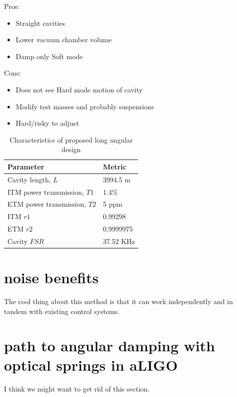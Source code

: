 Pros:

\begin{itemize}
	\item Straight cavities
	\item Lower vacuum chamber volume
	\item Damp only Soft mode
\end{itemize}

Cons:
\begin{itemize}
	\item Does not see Hard mode motion of cavity
	\item Modify test masses and probably suspensions
	\item Hard/risky to adjust
\end{itemize}


\begin{table}[htp]
\centering
\begin{tabular}{ l | l | }
\bf{Parameter}& \bf{Metric}  \\ \hline
Cavity length, $L$ & 3994.5 m \\ \hline
ITM power transmission, $T1$ & 1.4\% \\ \hline %
ETM power transmission, $T2$ & 5 ppm \\ \hline
ITM $r1$ & 0.99298 \\ \hline
ETM $r2$ &0.9999975 \\ \hline
Cavity $FSR$ & 37.52 KHz \\ \hline
\end{tabular}
\caption{Characteristics of proposed long angular design}
\label{tab:longproposal}
\end{table}

\section{noise benefits}

The cool thing about this method is that it can work independently and in tandem with existing control systems. 

\section{path to angular damping with optical springs in aLIGO}

I think we might want to get rid of this section.